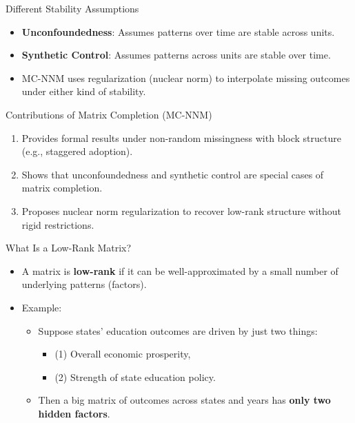 \documentclass{beamer}
\begin{document}
\begin{frame}{Different Stability Assumptions}
\small
\begin{itemize}
  \item \textbf{Unconfoundedness}: Assumes patterns over time are stable across units.
  \item \textbf{Synthetic Control}: Assumes patterns across units are stable over time.
  \item MC-NNM uses regularization (nuclear norm) to interpolate missing outcomes under either kind of stability.
\end{itemize}
\end{frame}



\begin{frame}{Contributions of Matrix Completion (MC-NNM)}
\small
\begin{enumerate}
  \item Provides formal results under non-random missingness with block structure (e.g., staggered adoption).
  \item Shows that unconfoundedness and synthetic control are special cases of matrix completion.
  \item Proposes nuclear norm regularization to recover low-rank structure without rigid restrictions.
\end{enumerate}
\end{frame}


\begin{frame}{What Is a Low-Rank Matrix?}
\small
\begin{itemize}
  \item A matrix is \textbf{low-rank} if it can be well-approximated by a small number of underlying patterns (factors).
  \item Example:
    \begin{itemize}
      \item Suppose states' education outcomes are driven by just two things:
      \begin{itemize}
        \item (1) Overall economic prosperity,
        \item (2) Strength of state education policy.
      \end{itemize}
      \item Then a big matrix of outcomes across states and years has \textbf{only two hidden factors}.
    \end{itemize}
\end{itemize}
\end{frame}
\end{document}
